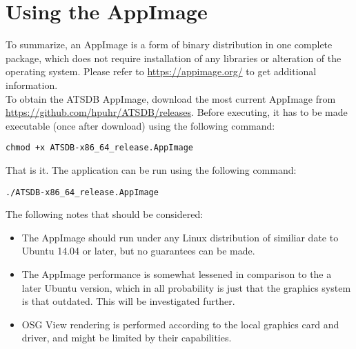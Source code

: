 \section{Using the AppImage}

To summarize, an AppImage is a form of binary distribution in one complete package, which does not require installation of any libraries or alteration of the operating system. Please refer to \url{https://appimage.org/} to get additional information. \\

To obtain the ATSDB AppImage, download the most current AppImage from \url{https://github.com/hpuhr/ATSDB/releases}. Before executing, it has to be made executable (once after download) using the following command:
\begin{verbatim}
chmod +x ATSDB-x86_64_release.AppImage
\end{verbatim}

That is it. The application can be run using the following command:
\begin{verbatim}
./ATSDB-x86_64_release.AppImage
\end{verbatim}

The following notes that should be considered:

\begin{itemize}  
\item The AppImage should run under any Linux distribution of similiar date to Ubuntu 14.04 or later, but no guarantees can be made.
\item The AppImage performance is somewhat lessened in comparison to the a later Ubuntu version, which in all probability is just that the graphics system is that outdated. This will be investigated further.
\item OSG View rendering is performed according to the local graphics card and driver, and might be limited by their capabilities.
\end{itemize} 
